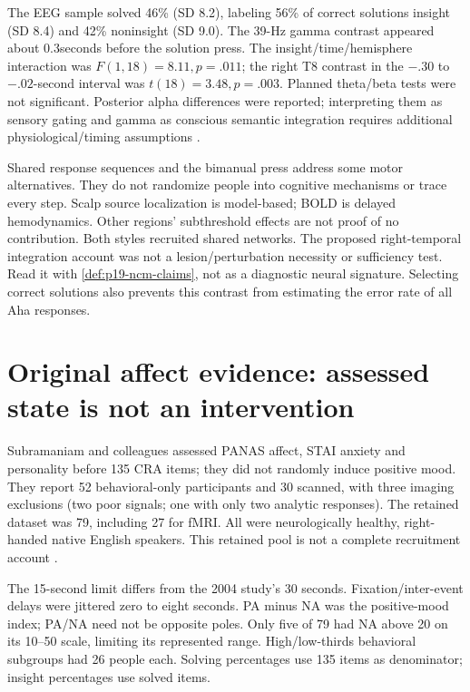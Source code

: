 The EEG sample solved 46\% (SD 8.2), labeling 56\% of correct solutions
insight (SD 8.4) and 42\% noninsight (SD 9.0).
The 39-Hz gamma contrast appeared about 0.3seconds before the solution press.
The insight/time/hemisphere interaction was \(F(1,18)=8.11,p=.011\);
the right T8 contrast in the \(-.30\) to \(-.02\)-second interval was
\(t(18)=3.48,p=.003\).
Planned theta/beta tests were not significant.
Posterior alpha differences were reported; interpreting them as sensory
gating and gamma as conscious semantic integration requires additional
physiological/timing assumptions
\parencite[pp.~504--508]{JungBeemanEtAl2004NeuralInsight}.

Shared response sequences and the bimanual press address some motor alternatives.
They do not randomize people into cognitive mechanisms or trace every step.
Scalp source localization is model-based; BOLD is delayed hemodynamics.
Other regions' subthreshold effects are not proof of no contribution.
Both styles recruited shared networks. The proposed right-temporal integration
account was not a lesion/perturbation necessity or sufficiency test.
Read it with \cref{def:p19-ncm-claims}, not as a diagnostic neural signature.
Selecting correct solutions also prevents this contrast from estimating
the error rate of all Aha responses.

\section{Original affect evidence: assessed state is not an intervention}
\label{sec:p19-insight-affect-evidence}

Subramaniam and colleagues assessed PANAS affect, STAI anxiety and personality
before 135 CRA items; they did not randomly induce positive mood.
They report 52 behavioral-only participants and 30 scanned, with three
imaging exclusions (two poor signals; one with only two analytic responses).
The retained dataset was 79, including 27 for fMRI.
All were neurologically healthy, right-handed native English speakers.
This retained pool is not a complete recruitment account
\parencite[pp.~418--420]{SubramaniamEtAl2009PositiveAffect}.

The 15-second limit differs from the 2004 study's 30 seconds.
Fixation/inter-event delays were jittered zero to eight seconds.
PA minus NA was the positive-mood index; PA/NA need not be opposite poles.
Only five of 79 had NA above 20 on its 10--50 scale, limiting its represented range.
High/low-thirds behavioral subgroups had 26 people each.
Solving percentages use 135 items as denominator; insight percentages use
solved items.

